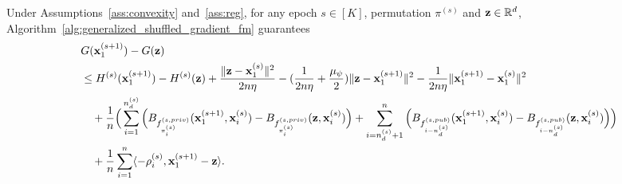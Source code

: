 \begin{lemma}
\label{lemma:one_epoch_bg_3pid}
    Under Assumptions~\ref{ass:convexity} and~\ref{ass:reg},
    for any epoch $s\in [K]$, permutation $\pi^{(s)}$ and ${\mathbf{z}}\in \mathbb{R}^d$, Algorithm~\ref{alg:generalized_shuffled_gradient_fm} guarantees
    \begin{align}
        &G({\mathbf{x}}_1^{(s+1)}) - G({\mathbf{z}})\\
        \nonumber
        &\leq H^{(s)}({\mathbf{x}}_1^{(s+1)}) - H^{(s)}({\mathbf{z}})
        + \frac{\|{\mathbf{z}} - {\mathbf{x}}_1^{(s)}\|^2}{2n \eta} - (\frac{1}{2n \eta} + \frac{\mu_\psi}{2}) \|{\mathbf{z}} - {\mathbf{x}}_1^{(s+1)}\|^2
        - \frac{1}{2n \eta}\|{\mathbf{x}}_1^{(s+1)} - {\mathbf{x}}_1^{(s)}\|^2\\
        \nonumber
        &\quad + \frac{1}{n} \Big(\sum_{i=1}^{n_d^{(s)}}\Big(
            B_{f_{\pi_i^{(s)}}^{(s, priv)}}({\mathbf{x}}_1^{(s+1)}, {\mathbf{x}}_i^{(s)}) - B_{f_{\pi_i^{(s)}}^{(s, priv)}}({\mathbf{z}}, {\mathbf{x}}_i^{(s)})
        \Big)
        + \sum_{i=n_d^{(s)}+1}^{n}\Big(
            B_{f_{i-n_d^{(s)}}^{(s, pub)}}({\mathbf{x}}_1^{(s+1)}, {\mathbf{x}}_i^{(s)})
            - B_{f_{i-n_d^{(s)}}^{(s, pub)}}({\mathbf{z}}, {\mathbf{x}}_i^{(s)})
        \Big)\Big)\\
        \nonumber
        &\quad + \frac{1}{n}\sum_{i=1}^{n}\langle -\rho_i^{(s)}, {\mathbf{x}}_1^{(s+1)} - {\mathbf{z}}\rangle. 
    \end{align}
\end{lemma}



